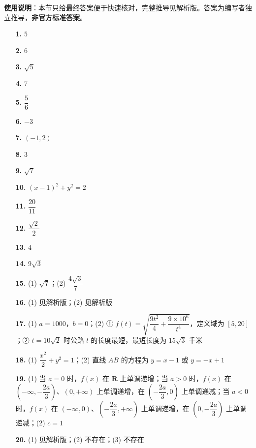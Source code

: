 
\begin{gknotice}
\textbf{使用说明}：本节只给最终答案便于快速核对，完整推导见解析版。答案为编写者独立推导，\textbf{非官方标准答案}。
\end{gknotice}

\begin{itemize}[leftmargin=2.6em]
  \item[\textbf{1.}] \(5\)
  \item[\textbf{2.}] \(6\)
  \item[\textbf{3.}] \(\sqrt{5}\)
  \item[\textbf{4.}] \(7\)
  \item[\textbf{5.}] \(\dfrac{5}{6}\)
  \item[\textbf{6.}] \(-3\)
  \item[\textbf{7.}] \((-1,2)\)
  \item[\textbf{8.}] \(3\)
  \item[\textbf{9.}] \(\sqrt{7}\)
  \item[\textbf{10.}] \((x-1)^{2}+y^{2}=2\)
  \item[\textbf{11.}] \(\dfrac{20}{11}\)
  \item[\textbf{12.}] \(\dfrac{\sqrt{2}}{2}\)
  \item[\textbf{13.}] \(4\)
  \item[\textbf{14.}] \(9\sqrt{3}\)
\end{itemize}

\begin{itemize}[leftmargin=2.6em]
  \item[\textbf{15.}] (1) \(\sqrt{7}\)；(2) \(\dfrac{4\sqrt{3}}{7}\)
  \item[\textbf{16.}] (1) 见解析版；(2) 见解析版
  \item[\textbf{17.}] (1) \(a=1000\)，\(b=0\)；(2) ① \(f(t)=\sqrt{\dfrac{9t^{2}}{4}+\dfrac{9\times10^{6}}{t^{4}}}\)，定义域为 \([5,20]\)；② \(t=10\sqrt{2}\) 时公路 \(l\) 的长度最短，最短长度为 \(15\sqrt{3}\) 千米
  \item[\textbf{18.}] (1) \(\dfrac{x^{2}}{2}+y^{2}=1\)；(2) 直线 \(AB\) 的方程为 \(y=x-1\) 或 \(y=-x+1\)
  \item[\textbf{19.}] (1) 当 \(a=0\) 时，\(f(x)\) 在 \(\mathbf{R}\) 上单调递增；当 \(a>0\) 时，\(f(x)\) 在 \(\left(-\infty,-\dfrac{2a}{3}\right)\)、\((0,+\infty)\) 上单调递增，在 \(\left(-\dfrac{2a}{3},0\right)\) 上单调递减；当 \(a<0\) 时，\(f(x)\) 在 \((-\infty,0)\)、\(\left(-\dfrac{2a}{3},+\infty\right)\) 上单调递增，在 \(\left(0,-\dfrac{2a}{3}\right)\) 上单调递减；(2) \(c=1\)
  \item[\textbf{20.}] (1) 见解析版；(2) 不存在；(3) 不存在
\end{itemize}

